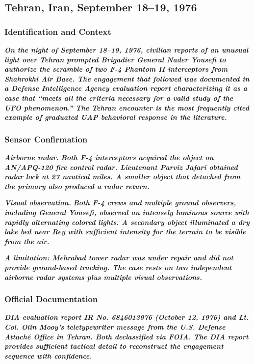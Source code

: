 \documentclass[11pt,letterpaper]{article}
\begin{document}
\subsection{Tehran, Iran, September 18--19, 1976}

\subsubsection{Identification and Context}

\textbf{\textit{On the night of September 18--19, 1976, civilian reports of an unusual light over Tehran prompted Brigadier General Nader Yousefi to authorize the scramble of two F-4 Phantom II interceptors from Shahrokhi Air Base. The engagement that followed was documented in a Defense Intelligence Agency evaluation report characterizing it as a case that ``meets all the criteria necessary for a valid study of the UFO phenomenon.'' The Tehran encounter is the most frequently cited example of graduated UAP behavioral response in the literature.}}


\subsubsection{Sensor Confirmation}

\textbf{\textit{Airborne radar.}}\textbf{\textit{ Both F-4 interceptors acquired the object on AN/APQ-120 fire control radar. Lieutenant Parviz Jafari obtained radar lock at 27 nautical miles. A smaller object that detached from the primary also produced a radar return.}}


\textbf{\textit{Visual observation.}}\textbf{\textit{ Both F-4 crews and multiple ground observers, including General Yousefi, observed an intensely luminous source with rapidly alternating colored lights. A secondary object illuminated a dry lake bed near Rey with sufficient intensity for the terrain to be visible from the air.}}


\textbf{\textit{A limitation: Mehrabad tower radar was under repair and did not provide ground-based tracking. The case rests on two independent airborne radar systems plus multiple visual observations.}}


\subsubsection{Official Documentation}

\textbf{\textit{DIA evaluation report IR No. 6846013976 (October 12, 1976) and Lt. Col. Olin Mooy's teletypewriter message from the U.S. Defense Attach\'e Office in Tehran. Both declassified via FOIA. The DIA report provides sufficient tactical detail to reconstruct the engagement sequence with confidence.}}
\end{document}

